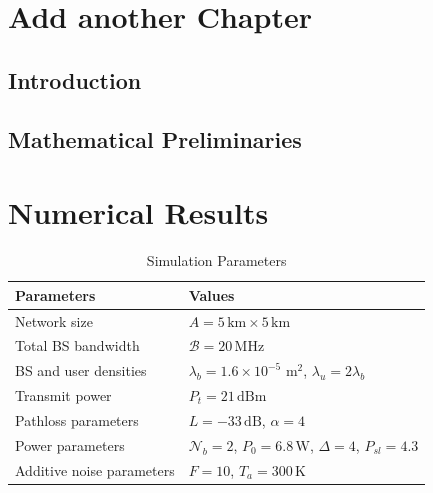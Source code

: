 \documentclass[12pt]{report}
\begin{document}
\chapter{Add another Chapter}

\section{Introduction}


\section{Mathematical Preliminaries}



\lipsum[2-4]









\chapter{Numerical Results}



\begin{table}[H]
\caption{Simulation Parameters} %
\centering %
    \begin{tabular}{| l | l |}
	 \hline\hline
    Parameters & Values \\ \hline
    Network size &  $A = 5\,\text{km}\times 5\,\text{km}$ \\ \hline
    Total BS bandwidth &  $\mathcal{B}=20\,\text{MHz}$ \\ \hline
		BS and user densities &  $\lambda_b = 1.6\times 10^{-5}\,\,\text{m}^2$, $\lambda_u = 2\lambda_b$  \\ \hline
    Transmit power &  $P_t = 21\, \text{dBm}$ \\ \hline
    Pathloss parameters & $L = -33\,\text{dB}$, $\alpha=4$ \\ \hline
    Power parameters & $\mathcal{N}_b = 2$, $P_0=6.8\,\text{W}$, $\Delta=4$, $P_{sl}=4.3$ \\\hline	
    Additive noise parameters & $F = 10$, $T_a = 300\,\text{K}$\\\hline		
\end{tabular}
\end{table}
\end{document}

